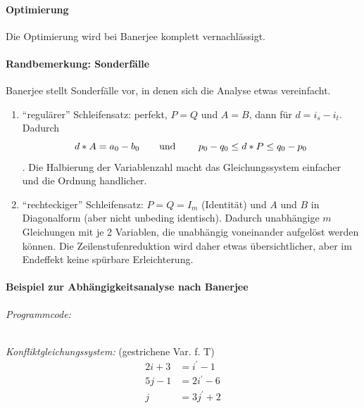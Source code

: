\paragraph{Optimierung}
Die Optimierung wird bei Banerjee komplett vernachlässigt.

\paragraph{Randbemerkung: Sonderfälle}
Banerjee stellt Sonderfälle vor, in denen sich die Analyse etwas vereinfacht.
\begin{enumerate}
\item ``regulärer'' Schleifensatz: perfekt, $P=Q$ und $A=B$, dann für $d
  = i_s-i_t$. Dadurch $$ d * A = a_0-b_0 \hbox{\qquad und \qquad} p_0-q_0 \leq
  d*P \leq q_0-p_0$$. Die Halbierung der Variablenzahl macht das
  Gleichungssystem einfacher und die Ordnung handlicher.
\item ``rechteckiger'' Schleifensatz: $P=Q=I_m$ (Identität) und $A$ und
  $B$ in Diagonalform (aber nicht unbeding identisch). Dadurch
  unabhängige $m$ Gleichungen mit je 2 Variablen, die unabhängig
  voneinander aufgelöst werden können. Die Zeilenstufenreduktion wird
  daher etwas übersichtlicher, aber im Endeffekt keine spürbare
  Erleichterung.
\end{enumerate}

\paragraph{Beispiel zur Abhängigkeitsanalyse nach Banerjee}
\textit{Programmcode:}\\

\begin{procedure}
\SetAlgoLined
{}
\end{procedure}
~\\
\textit{Konfliktgleichungssystem:} (gestrichene Var. f. T)\\

\begin{align*}
2i+3 &= i^\prime  - 1\\
5j-1 &= 2i^\prime - 6\\
 j   &= 3j^\prime + 2
\end{align*}

